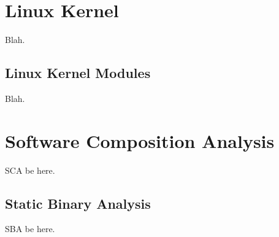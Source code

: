 
\section{Linux Kernel}

Blah.

\subsection{Linux Kernel Modules}

Blah.

\section{Software Composition Analysis}

SCA be here.

\subsection{Static Binary Analysis}

SBA be here.
